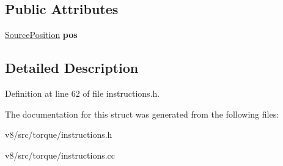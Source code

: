 \subsection*{Public Attributes}
\begin{DoxyCompactItemize}
\item 
\mbox{\label{structv8_1_1internal_1_1torque_1_1InstructionBase_a11b2d8773369d918b9a2b1d694a3eae8}} 
\mbox{\hyperlink{structv8_1_1internal_1_1torque_1_1SourcePosition}{Source\+Position}} {\bfseries pos}
\end{DoxyCompactItemize}


\subsection{Detailed Description}


Definition at line 62 of file instructions.\+h.



The documentation for this struct was generated from the following files\+:\begin{DoxyCompactItemize}
\item 
v8/src/torque/instructions.\+h\item 
v8/src/torque/instructions.\+cc\end{DoxyCompactItemize}
